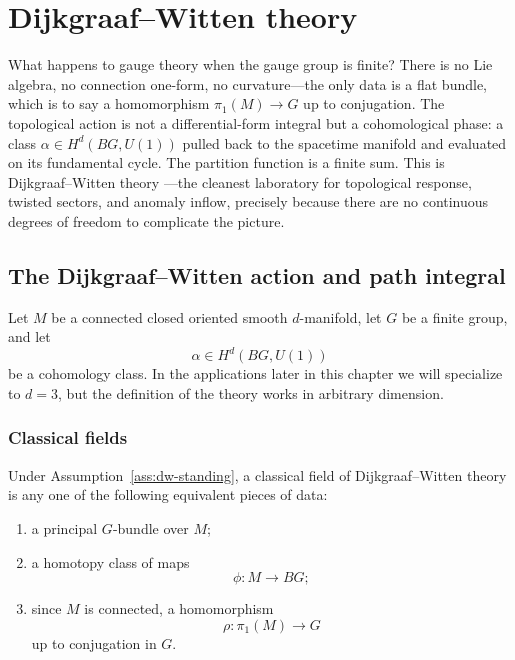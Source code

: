 \chapter{Dijkgraaf--Witten theory}\label{ch:dw}

What happens to gauge theory when the gauge group is finite?  There is no Lie algebra, no connection one-form, no curvature---the only data is a flat bundle, which is to say a homomorphism $\pi_1(M) \to G$ up to conjugation.  The topological action is not a differential-form integral but a cohomological phase: a class $\alpha \in H^d(BG, U(1))$ pulled back to the spacetime manifold and evaluated on its fundamental cycle.  The partition function is a finite sum.  This is Dijkgraaf--Witten theory \cite{DijkgraafWitten1990}---the cleanest laboratory for topological response, twisted sectors, and anomaly inflow, precisely because there are no continuous degrees of freedom to complicate the picture.

\section{The Dijkgraaf--Witten action and path integral}\label{sec:dw-action}

\begin{assumption}\label{ass:dw-standing}
Let $M$ be a connected closed oriented smooth $d$-manifold, let $G$ be a finite group, and let
\begin{equation*}
\alpha \in H^d(BG,U(1))
\end{equation*}
be a cohomology class. In the applications later in this chapter we will specialize to $d=3$, but the definition of the theory works in arbitrary dimension.
\end{assumption}

\subsection{Classical fields}

\begin{definition}\label{def:dw-field}
Under Assumption~\ref{ass:dw-standing}, a classical field of Dijkgraaf--Witten theory is any one of the following equivalent pieces of data:
\begin{enumerate}
\item a principal $G$-bundle over $M$;
\item a homotopy class of maps
\begin{equation*}
\phi:M\to BG;
\end{equation*}
\item since $M$ is connected, a homomorphism
\begin{equation*}
\rho:\pi_1(M)\to G
\end{equation*}
up to conjugation in $G$.
\end{enumerate}
\end{definition}

